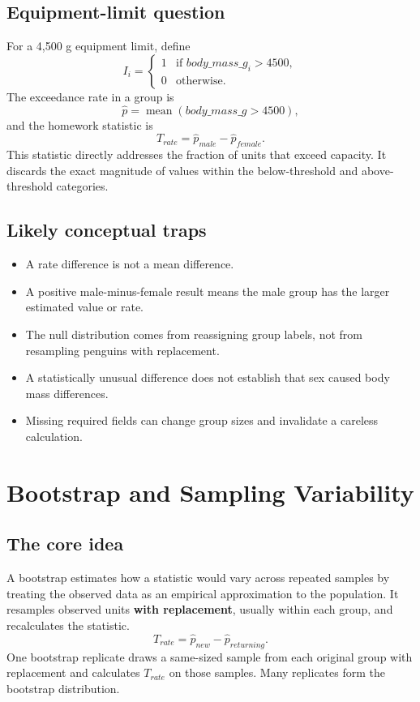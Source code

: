 \documentclass[11pt]{article}
\begin{document}
\subsection{Equipment-limit question}
For a 4,500 g equipment limit, define
\[
I_i = \begin{cases}
1 & \text{if } body\_mass\_g_i > 4500,\\
0 & \text{otherwise.}
\end{cases}
\]
The exceedance rate in a group is
\[
\hat p = \operatorname{mean}(body\_mass\_g > 4500),
\]
and the homework statistic is
\[
T_{rate} = \hat p_{male} - \hat p_{female}.
\]
This statistic directly addresses the fraction of units that exceed capacity. It discards the exact magnitude of values within the below-threshold and above-threshold categories.

\subsection{Likely conceptual traps}
\begin{itemize}
	\item A rate difference is not a mean difference.
	\item A positive male-minus-female result means the male group has the larger estimated value or rate.
	\item The null distribution comes from reassigning group labels, not from resampling penguins with replacement.
	\item A statistically unusual difference does not establish that sex caused body mass differences.
	\item Missing required fields can change group sizes and invalidate a careless calculation.
\end{itemize}

\section{Bootstrap and Sampling Variability}
\subsection{The core idea}
A bootstrap estimates how a statistic would vary across repeated samples by treating the observed data as an empirical approximation to the population. It resamples observed units \textbf{with replacement}, usually within each group, and recalculates the statistic.
\[
T_{rate} = \hat p_{new} - \hat p_{returning}.
\]
One bootstrap replicate draws a same-sized sample from each original group with replacement and calculates $T_{rate}$ on those samples. Many replicates form the bootstrap distribution.
\end{document}
